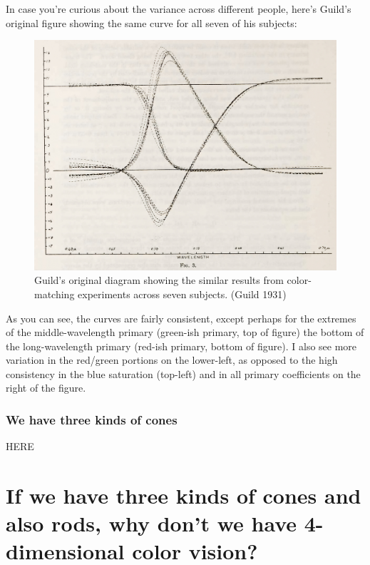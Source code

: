 \documentclass[
]{article}
\begin{document}
In case you're curious about the variance across different people,
here's Guild's original figure showing the same curve for all seven of
his subjects:

\begin{figure}
\centering
\begin{center}\includegraphics[width=1.0\textwidth]{img/Guild_different_subjects.jpg}\end{center}
\caption{Guild's original diagram showing the similar results from
color-matching experiments across seven subjects. (Guild 1931)}
\end{figure}

As you can see, the curves are fairly consistent, except perhaps for the
extremes of the middle-wavelength primary (green-ish primary, top of
figure) the bottom of the long-wavelength primary (red-ish primary,
bottom of figure). I also see more variation in the red/green portions
on the lower-left, as opposed to the high consistency in the blue
saturation (top-left) and in all primary coefficients on the right of
the figure.

\hypertarget{we-have-three-kinds-of-cones}{%
\subsubsection{We have three kinds of
cones}\label{we-have-three-kinds-of-cones}}

HERE

\hypertarget{if-we-have-three-kinds-of-cones-and-also-rods-why-dont-we-have-4-dimensional-color-vision}{%
\section{If we have three kinds of cones and also rods, why don't we
have 4-dimensional color
vision?}\label{if-we-have-three-kinds-of-cones-and-also-rods-why-dont-we-have-4-dimensional-color-vision}}
\end{document}
